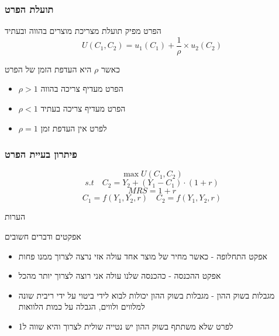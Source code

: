 \documentclass[usenames,dvipsnames]{beamer}
\begin{document}
\begin{RTL}
    


\begin{frame}
    \frametitle{תועלת הפרט}
    הפרט מפיק תועלת מצריכת מוצרים בהווה ובעתיד
    \begin{equation*}
        U(C_1,C_2) = u_1(C_1) + \frac{1}{\rho} \times u_2(C_2)
    \end{equation*}

    כאשר $\rho$ היא העדפת הזמן של הפרט
    \begin{itemize}
        \item $\rho > 1$ הפרט מעדיף צריכה בהווה
        \item $\rho < 1$ הפרט מעדיף צריכה בעתיד
        \item $\rho = 1$ לפרט אין העדפת זמן
    \end{itemize}    

\end{frame}

\begin{frame}
    \frametitle{פיתרון בעיית הפרט}
    \begin{equation}
        \max U(C_1,C_2) 
    \end{equation}
    \begin{equation}
        s.t \quad C_2 = Y_2 + (Y_1 - C_1) \cdot (1+r)
    \end{equation}
    \begin{equation}
        MRS = 1+r
    \end{equation}
    \begin{equation}
        C_1 = f\left(Y_1,Y_2,r\right)  \quad C_2 = f\left(Y_1,Y_2,r\right)
    \end{equation}
\end{frame}

\begin{frame}{הערות}
    \begin{block}{אפקטים ודברים חשובים}
        \begin{itemize}
            \item אפקט התחלופה - כאשר מחיר של מוצר אחד עולה אזי נרצה לצרוך ממנו פחות
            \item אפקט ההכנסה - כהכנסה שלנו עולה אני רוצה לצרוך יותר מהכל
            \item מגבלות בשוק ההון - מגבלות בשוק ההון יכולות לבוא לידי ביטוי על ידי ריבית שונה למלווים ולווים, הגבלה על כמות הלוואות
            \item לפרט שלא משתתף בשוק ההון יש נטייה שולית לצרוך והיא שווה ל1
        \end{itemize}
    \end{block}
    
    
\end{frame}
\end{RTL}
\end{document}
